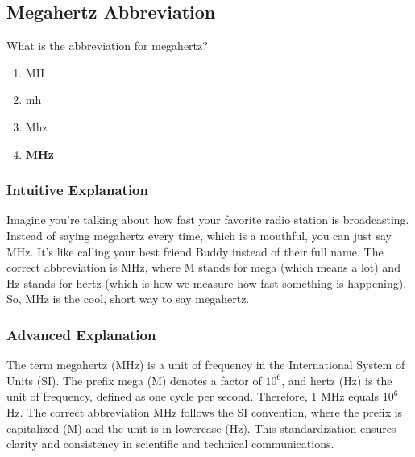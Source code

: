 \subsection{Megahertz Abbreviation}
\label{T5C07}

\begin{tcolorbox}[colback=gray!10!white,colframe=black!75!black,title=T5C07]
What is the abbreviation for megahertz?
\begin{enumerate}[label=\Alph*)]
    \item MH
    \item mh
    \item Mhz
    \item \textbf{MHz}
\end{enumerate}
\end{tcolorbox}

\subsubsection{Intuitive Explanation}
Imagine you're talking about how fast your favorite radio station is broadcasting. Instead of saying megahertz every time, which is a mouthful, you can just say MHz. It's like calling your best friend Buddy instead of their full name. The correct abbreviation is MHz, where M stands for mega (which means a lot) and Hz stands for hertz (which is how we measure how fast something is happening). So, MHz is the cool, short way to say megahertz.

\subsubsection{Advanced Explanation}
The term megahertz (MHz) is a unit of frequency in the International System of Units (SI). The prefix mega (M) denotes a factor of \(10^6\), and hertz (Hz) is the unit of frequency, defined as one cycle per second. Therefore, 1 MHz equals \(10^6\) Hz. The correct abbreviation MHz follows the SI convention, where the prefix is capitalized (M) and the unit is in lowercase (Hz). This standardization ensures clarity and consistency in scientific and technical communications.

